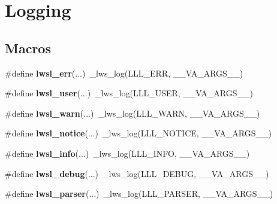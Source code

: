 \hypertarget{group__log}{}\section{Logging}
\label{group__log}
\subsection*{Macros}
\begin{DoxyCompactItemize}
\item 
\mbox{\label{group__log_gad44c15d00076052a398244035a7dbb56}} 
\#define {\bfseries lwsl\+\_\+err}(...)~\+\_\+lws\+\_\+log(L\+L\+L\+\_\+\+E\+RR, \+\_\+\+\_\+\+V\+A\+\_\+\+A\+R\+G\+S\+\_\+\+\_\+)
\item 
\mbox{\label{group__log_ga9aad07786eb4b3189b0eac919b2a960f}} 
\#define {\bfseries lwsl\+\_\+user}(...)~\+\_\+lws\+\_\+log(L\+L\+L\+\_\+\+U\+S\+ER, \+\_\+\+\_\+\+V\+A\+\_\+\+A\+R\+G\+S\+\_\+\+\_\+)
\item 
\mbox{\label{group__log_ga1bcd293826c0a91d6e7ac3c54db72885}} 
\#define {\bfseries lwsl\+\_\+warn}(...)~\+\_\+lws\+\_\+log(L\+L\+L\+\_\+\+W\+A\+RN, \+\_\+\+\_\+\+V\+A\+\_\+\+A\+R\+G\+S\+\_\+\+\_\+)
\item 
\mbox{\label{group__log_ga86b3c56c638569eb93919c52a1d5dfaf}} 
\#define {\bfseries lwsl\+\_\+notice}(...)~\+\_\+lws\+\_\+log(L\+L\+L\+\_\+\+N\+O\+T\+I\+CE, \+\_\+\+\_\+\+V\+A\+\_\+\+A\+R\+G\+S\+\_\+\+\_\+)
\item 
\mbox{\label{group__log_gaf13957a4d9fb47c070b9320303c32502}} 
\#define {\bfseries lwsl\+\_\+info}(...)~\+\_\+lws\+\_\+log(L\+L\+L\+\_\+\+I\+N\+FO, \+\_\+\+\_\+\+V\+A\+\_\+\+A\+R\+G\+S\+\_\+\+\_\+)
\item 
\mbox{\label{group__log_ga74a1a3d4d96b146a0ac45faab0028ade}} 
\#define {\bfseries lwsl\+\_\+debug}(...)~\+\_\+lws\+\_\+log(L\+L\+L\+\_\+\+D\+E\+B\+UG, \+\_\+\+\_\+\+V\+A\+\_\+\+A\+R\+G\+S\+\_\+\+\_\+)
\item 
\mbox{\label{group__log_gaee051a14945bec746ed3b527f384dc72}} 
\#define {\bfseries lwsl\+\_\+parser}(...)~\+\_\+lws\+\_\+log(L\+L\+L\+\_\+\+P\+A\+R\+S\+ER, \+\_\+\+\_\+\+V\+A\+\_\+\+A\+R\+G\+S\+\_\+\+\_\+)

\end{DoxyCompactItemize}
